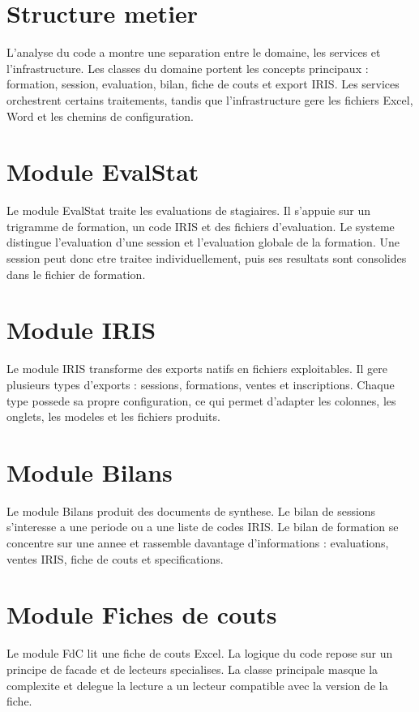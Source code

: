 \documentclass[11pt,a4paper]{report}
\begin{document}
\section{Structure metier}

L'analyse du code a montre une separation entre le domaine, les services et l'infrastructure. Les classes du domaine portent les concepts principaux : formation, session, evaluation, bilan, fiche de couts et export IRIS. Les services orchestrent certains traitements, tandis que l'infrastructure gere les fichiers Excel, Word et les chemins de configuration.

\section{Module EvalStat}

Le module EvalStat traite les evaluations de stagiaires. Il s'appuie sur un trigramme de formation, un code IRIS et des fichiers d'evaluation. Le systeme distingue l'evaluation d'une session et l'evaluation globale de la formation. Une session peut donc etre traitee individuellement, puis ses resultats sont consolides dans le fichier de formation.

\section{Module IRIS}

Le module IRIS transforme des exports natifs en fichiers exploitables. Il gere plusieurs types d'exports : sessions, formations, ventes et inscriptions. Chaque type possede sa propre configuration, ce qui permet d'adapter les colonnes, les onglets, les modeles et les fichiers produits.

\section{Module Bilans}

Le module Bilans produit des documents de synthese. Le bilan de sessions s'interesse a une periode ou a une liste de codes IRIS. Le bilan de formation se concentre sur une annee et rassemble davantage d'informations : evaluations, ventes IRIS, fiche de couts et specifications.

\section{Module Fiches de couts}

Le module FdC lit une fiche de couts Excel. La logique du code repose sur un principe de facade et de lecteurs specialises. La classe principale masque la complexite et delegue la lecture a un lecteur compatible avec la version de la fiche.
\end{document}
